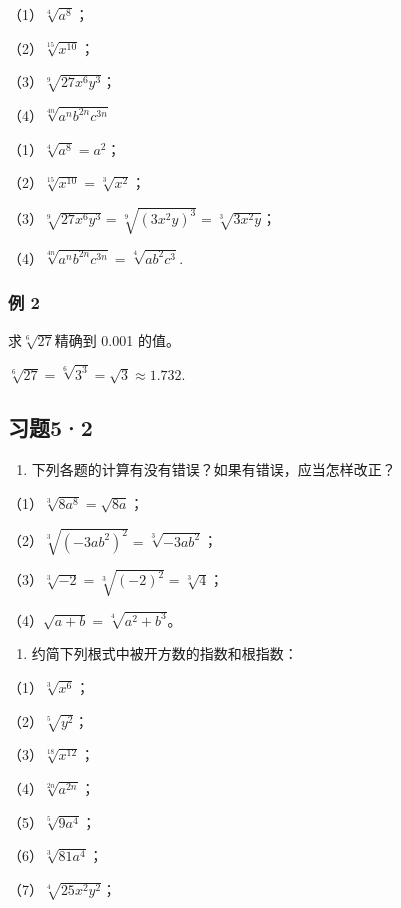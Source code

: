 （1）\(\sqrt[4]{a^8}\)；

（2）\(\sqrt[15]{x^{10}}\)；

（3）\(\sqrt[9]{27x^6y^3}\)；

（4）\(\sqrt[4n]{a^n b^{2n}c^{3n}}\)

 （1）\(\sqrt[4]{a^8} = a^2\)；

（2）\(\sqrt[15]{x^{10}} = \sqrt[3]{x^2}\)；

（3）\(\sqrt[9]{27x^6y^3} = \sqrt[9]{(3x^2y)^3} = \sqrt[3]{3x^2y}\)；

（4）\(\sqrt[4n]{a^n b^{2n}c^{3n}} = \sqrt[4]{ab^2c^3}.\)

\subsubsection{例 2}

求\(\sqrt[6]{27}\)精确到 0.001 的值。

\(\sqrt[6]{27} = \sqrt[6]{3^3} = \sqrt{3} \approx 1.732.\)

\subsection{习题5·2}

\begin{enumerate}
\item
  下列各题的计算有没有错误？如果有错误，应当怎样改正？
\end{enumerate}

（1）\(\sqrt[3]{8a^8} = \sqrt{8a}\)；

（2）\(\sqrt[3]{(-3ab^2)^2} = \sqrt[3]{-3ab^2}\)；

（3）\(\sqrt[3]{-2} = \sqrt[3]{(-2)^2} = \sqrt[3]{4}\)；

（4）\(\sqrt{a + b} = \sqrt[4]{a^2 + b^3}\)。

\begin{enumerate}[start=2]
\item
  约简下列根式中被开方数的指数和根指数：
\end{enumerate}

（1）\(\sqrt[3]{x^6}\)；

（2）\(\sqrt[5]{y^2}\)；

（3）\(\sqrt[18]{x^{12}}\)；

（4）\(\sqrt[2n]{a^{2n}}\)；

（5）\(\sqrt[5]{9a^4}\)；

（6）\(\sqrt[3]{81a^4}\)；

（7）\(\sqrt[4]{25x^2y^2}\)；

